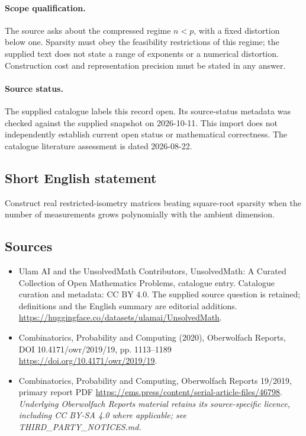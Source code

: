 \documentclass[11pt]{article}
\begin{document}
\paragraph{Scope qualification.}
The source asks about the compressed regime $n<p$, with a fixed distortion below one. Sparsity must obey the feasibility restrictions of this regime; the supplied text does not state a range of exponents or a numerical distortion. Construction cost and representation precision must be stated in any answer.
\paragraph{Source status.}
The supplied catalogue labels this record open. Its source-status metadata was checked against the supplied snapshot on 2026-10-11. This import does not independently establish current open status or mathematical correctness. The catalogue literature assessment is dated 2026-08-22.
\subsection{Short English statement}
Construct real restricted-isometry matrices beating square-root sparsity when the number of measurements grows polynomially with the ambient dimension.
\subsection{Sources}
\begin{itemize}
\item[S1] Ulam AI and the UnsolvedMath Contributors, UnsolvedMath: A Curated Collection of Open Mathematics Problems, catalogue entry. Catalogue curation and metadata: CC BY 4.0. The supplied source question is retained; definitions and the English summary are editorial additions.
\url{https://huggingface.co/datasets/ulamai/UnsolvedMath}.
\item[S2] Combinatorics, Probability and Computing (2020), Oberwolfach Reports, DOI 10.4171/owr/2019/19, pp. 1113--1189
\url{https://doi.org/10.4171/owr/2019/19}.
\item[S3] Combinatorics, Probability and Computing, Oberwolfach Reports 19/2019, primary report PDF
\url{https://ems.press/content/serial-article-files/46798}.
\textit{Underlying Oberwolfach Reports material retains its source-specific licence, including CC BY-SA 4.0 where applicable; see THIRD\_PARTY\_NOTICES.md.}
\end{itemize}
\end{document}
